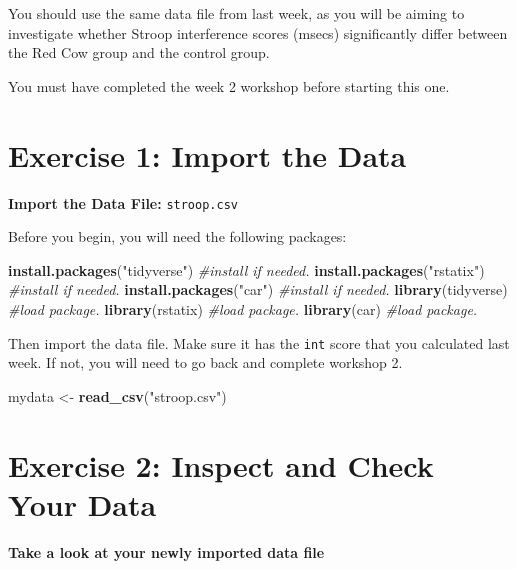 \documentclass[
]{book}
\newenvironment{Shaded}{\begin{snugshade}}{\end{snugshade}}
\newcommand{\CommentTok}[1]{\textcolor[rgb]{0.56,0.35,0.01}{\textit{#1}}}
\newcommand{\FunctionTok}[1]{\textcolor[rgb]{0.13,0.29,0.53}{\textbf{#1}}}
\newcommand{\NormalTok}[1]{#1}
\newcommand{\OtherTok}[1]{\textcolor[rgb]{0.56,0.35,0.01}{#1}}
\newcommand{\StringTok}[1]{\textcolor[rgb]{0.31,0.60,0.02}{#1}}
\let\oldsection\section
\renewcommand{\section}{\needspace{5\baselineskip}\oldsection}
\begin{document}
You should use the same data file from last week, as you will be aiming to investigate whether Stroop interference scores (msecs) significantly differ between the Red Cow group and the control group.

You must have completed the week 2 workshop before starting this one.

\section{Exercise 1: Import the Data}\label{exercise-1-import-the-data-2}

\textbf{Import the Data File:} \texttt{stroop.csv}

Before you begin, you will need the following packages:

\begin{Shaded}
\begin{Highlighting}[]
\FunctionTok{install.packages}\NormalTok{(}\StringTok{"tidyverse"}\NormalTok{) }\CommentTok{\#install if needed.}
\FunctionTok{install.packages}\NormalTok{(}\StringTok{"rstatix"}\NormalTok{)   }\CommentTok{\#install if needed.}
\FunctionTok{install.packages}\NormalTok{(}\StringTok{"car"}\NormalTok{)       }\CommentTok{\#install if needed.}
\FunctionTok{library}\NormalTok{(tidyverse)            }\CommentTok{\#load package.}
\FunctionTok{library}\NormalTok{(rstatix)              }\CommentTok{\#load package.}
\FunctionTok{library}\NormalTok{(car)                  }\CommentTok{\#load package.}
\end{Highlighting}
\end{Shaded}

Then import the data file. Make sure it has the \texttt{int} score that you calculated last week. If not, you will need to go back and complete workshop 2.

\begin{Shaded}
\begin{Highlighting}[]
\NormalTok{mydata }\OtherTok{\textless{}{-}} \FunctionTok{read\_csv}\NormalTok{(}\StringTok{"stroop.csv"}\NormalTok{)}
\end{Highlighting}
\end{Shaded}

\section{Exercise 2: Inspect and Check Your Data}\label{exercise-2-inspect-and-check-your-data-2}

\textbf{Take a look at your newly imported data file}
\end{document}
